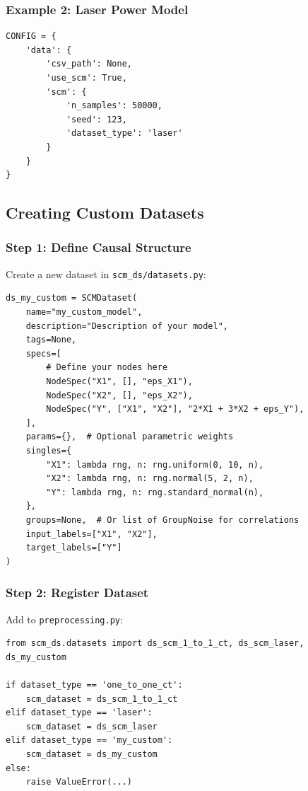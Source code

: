 \documentclass[11pt,a4paper]{article}
\begin{document}
\subsubsection{Example 2: Laser Power Model}

\begin{lstlisting}[caption={Config for Laser Model}]
CONFIG = {
    'data': {
        'csv_path': None,
        'use_scm': True,
        'scm': {
            'n_samples': 50000,
            'seed': 123,
            'dataset_type': 'laser'
        }
    }
}
\end{lstlisting}

\subsection{Creating Custom Datasets}

\subsubsection{Step 1: Define Causal Structure}

Create a new dataset in \texttt{scm\_ds/datasets.py}:

\begin{lstlisting}[caption={Custom Dataset Template}]
ds_my_custom = SCMDataset(
    name="my_custom_model",
    description="Description of your model",
    tags=None,
    specs=[
        # Define your nodes here
        NodeSpec("X1", [], "eps_X1"),
        NodeSpec("X2", [], "eps_X2"),
        NodeSpec("Y", ["X1", "X2"], "2*X1 + 3*X2 + eps_Y"),
    ],
    params={},  # Optional parametric weights
    singles={
        "X1": lambda rng, n: rng.uniform(0, 10, n),
        "X2": lambda rng, n: rng.normal(5, 2, n),
        "Y": lambda rng, n: rng.standard_normal(n),
    },
    groups=None,  # Or list of GroupNoise for correlations
    input_labels=["X1", "X2"],
    target_labels=["Y"]
)
\end{lstlisting}

\subsubsection{Step 2: Register Dataset}

Add to \texttt{preprocessing.py}:

\begin{lstlisting}
from scm_ds.datasets import ds_scm_1_to_1_ct, ds_scm_laser, ds_my_custom

if dataset_type == 'one_to_one_ct':
    scm_dataset = ds_scm_1_to_1_ct
elif dataset_type == 'laser':
    scm_dataset = ds_scm_laser
elif dataset_type == 'my_custom':
    scm_dataset = ds_my_custom
else:
    raise ValueError(...)
\end{lstlisting}
\end{document}
